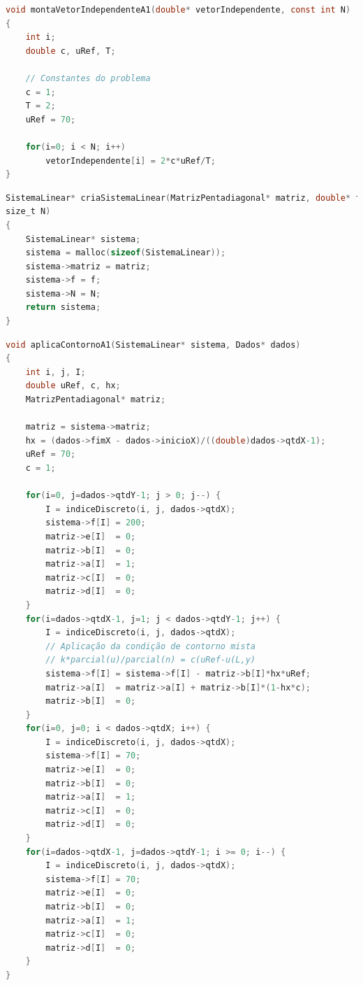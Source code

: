 \documentclass[
	11pt,				%
	oneside,			%
	a4paper,			%
	english,			%
	brazil,				%
	]{article}
\begin{document}
\begin{lstlisting}[language=C, caption=Função Cria Vetor Independente A1]
void montaVetorIndependenteA1(double* vetorIndependente, const int N)
{
    int i;
    double c, uRef, T;

    // Constantes do problema
    c = 1;
    T = 2;
    uRef = 70;

    for(i=0; i < N; i++)
        vetorIndependente[i] = 2*c*uRef/T;
}
\end{lstlisting}

\begin{lstlisting}[language=C, caption=Função Cria Sistema Linear]
SistemaLinear* criaSistemaLinear(MatrizPentadiagonal* matriz, double* f, const 
size_t N)
{
    SistemaLinear* sistema;
    sistema = malloc(sizeof(SistemaLinear));
    sistema->matriz = matriz;
    sistema->f = f;
    sistema->N = N;
    return sistema;
}
\end{lstlisting}

\begin{lstlisting}[language=C, caption=Função Aplica Contorno A1]
void aplicaContornoA1(SistemaLinear* sistema, Dados* dados)
{
	int i, j, I;
    double uRef, c, hx;
    MatrizPentadiagonal* matriz;

    matriz = sistema->matriz;
	hx = (dados->fimX - dados->inicioX)/((double)dados->qtdX-1);
    uRef = 70;
    c = 1;

    for(i=0, j=dados->qtdY-1; j > 0; j--) {
        I = indiceDiscreto(i, j, dados->qtdX);
        sistema->f[I] = 200;
        matriz->e[I]  = 0;
        matriz->b[I]  = 0;
        matriz->a[I]  = 1;
        matriz->c[I]  = 0;
        matriz->d[I]  = 0;
    }
    for(i=dados->qtdX-1, j=1; j < dados->qtdY-1; j++) {
        I = indiceDiscreto(i, j, dados->qtdX);
        // Aplicação da condição de contorno mista
        // k*parcial(u)/parcial(n) = c(uRef-u(L,y)
        sistema->f[I] = sistema->f[I] - matriz->b[I]*hx*uRef;
        matriz->a[I]  = matriz->a[I] + matriz->b[I]*(1-hx*c);
        matriz->b[I]  = 0;
    }
    for(i=0, j=0; i < dados->qtdX; i++) {
        I = indiceDiscreto(i, j, dados->qtdX);
        sistema->f[I] = 70;
        matriz->e[I]  = 0;
        matriz->b[I]  = 0;
        matriz->a[I]  = 1;
        matriz->c[I]  = 0;
        matriz->d[I]  = 0;
    }
    for(i=dados->qtdX-1, j=dados->qtdY-1; i >= 0; i--) {
        I = indiceDiscreto(i, j, dados->qtdX);
        sistema->f[I] = 70;
        matriz->e[I]  = 0;
        matriz->b[I]  = 0;
        matriz->a[I]  = 1;
        matriz->c[I]  = 0;
        matriz->d[I]  = 0;
    }
}
\end{lstlisting}
\end{document}

